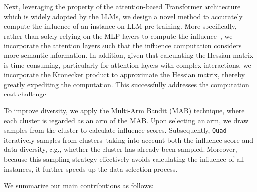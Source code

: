 \documentclass{article} %
\begin{document}
Next, leveraging the property of the attention-based Transformer architecture which is widely adopted by the LLMs, we design a novel method to accurately compute the influence of an instance on LLM pre-training. More specifically, rather than solely relying on the MLP layers to compute the influence~\citep{koh2017understanding, yu2024mates, grosse2023studying, engstrom2024dsdm}, we incorporate the attention layers such that the influence computation considers more semantic information. In addition, given that calculating the Hessian matrix is time-consuming, particularly for attention layers with complex interactions, we incorporate the Kronecker product to approximate  the Hessian matrix, thereby greatly expediting the computation. This successfully addresses the computation cost challenge.

To improve diversity, we apply the Multi-Arm Bandit (MAB) technique, where each cluster is regarded as an arm of the MAB. Upon selecting an arm, we draw samples from the cluster to calculate influence scores. Subsequently, \texttt{Quad} iteratively samples from clusters, taking into account both the influence score and data diversity, e.g., whether the cluster has already been sampled. Moreover, because this sampling strategy effectively avoids calculating the influence of all instances, it further speeds up the data selection process.





We summarize our main contributions as follows:
\end{document}
